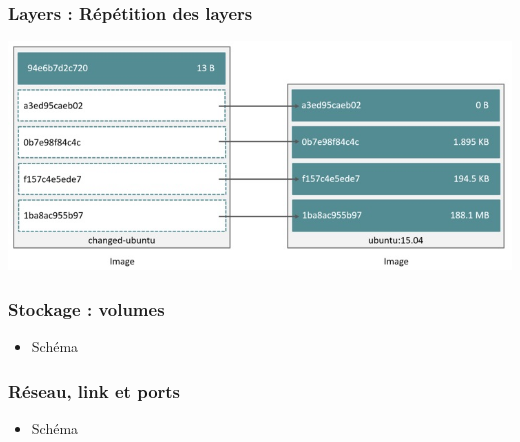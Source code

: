  \begin{frame}
    \frametitle{Layers : Répétition des layers}
    \begin{itemize}
      \includegraphics[width=\linewidth,height=\textheight]{images/docker/saving-space.jpg}
    \end{itemize}
  \end{frame}

  \begin{frame}
    \frametitle{Stockage : volumes}
    \begin{itemize}
      \item Schéma
    \end{itemize}
  \end{frame}

  \begin{frame}
    \frametitle{Réseau, link et ports}
    \begin{itemize}
      \item Schéma
    \end{itemize}
  \end{frame}
